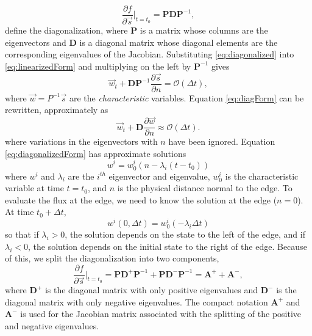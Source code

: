 \documentclass{softwaremanual}
\begin{document}
\begin{equation}
\frac{\partial f}{\partial \vec{s}}|_{t=t_0} = \boldsymbol{P} \boldsymbol{D} \boldsymbol{P}^{-1},\label{eq:diagonalized}
\end{equation} 
define the diagonalization, where $\boldsymbol{P}$ is a matrix whose columns are the eigenvectors and $\boldsymbol{D}$ is a diagonal matrix whose diagonal elements are the corresponding eigenvalues of the Jacobian. Substituting \eqref{eq:diagonalized} into \eqref{eq:linearizedForm} and multiplying on the left by $\boldsymbol{P}^{-1}$ gives
\begin{equation}
\vec{w}_t + \boldsymbol{D} \boldsymbol{P}^{-1}\frac{\partial \vec{s}}{\partial n}  = \mathcal{O}(\Delta t), \label{eq:diagForm}
\end{equation}
where $\vec{w} = P^{-1}\vec{s}$ are the \textit{characteristic} variables. Equation \eqref{eq:diagForm} can be rewritten, approximately as
\begin{equation}
\vec{w}_t + \boldsymbol{D} \frac{\partial \vec{w}}{\partial n}  \approx \mathcal{O}(\Delta t). \label{eq:diagonalizedForm}
\end{equation}
where variations in the eigenvectors with $n$ have been ignored. Equation \eqref{eq:diagonalizedForm} has approximate solutions
\begin{equation}
w^i = w^i_0( n - \lambda_i (t-t_0)) \label{eq:characteristicSolution}
\end{equation}
where $w^i$ and $\lambda_i$ are the $i^{th}$ eigenvector and eigenvalue, $w^i_0$ is the characteristic variable at time $t=t_0$, and $n$ is the physical distance normal to the edge. To evaluate the flux at the edge, we need to know the solution at the edge ($n=0$). At time $t_0 + \Delta t$,
\begin{equation}
w^i(0, \Delta t) = w^i_0(-\lambda_i\Delta t)
\end{equation}  
so that if $\lambda_i > 0$, the solution depends on the state to the left of the edge, and if $\lambda_i < 0$, the solution depends on the initial state to the right of the edge. Because of this, we split the diagonalization into two components,
\begin{equation}
\frac{\partial f}{\partial \vec{s}}|_{t=t_0} = \boldsymbol{P} \boldsymbol{D}^{+} \boldsymbol{P}^{-1} + \boldsymbol{P} \boldsymbol{D}^{-} \boldsymbol{P}^{-1} = \boldsymbol{A}^{+} + \boldsymbol{A}^{-},\label{eq:diagonalized-split}
\end{equation}
where $\boldsymbol{D}^{+}$ is the diagonal matrix with only positive eigenvalues and $\boldsymbol{D}^{-}$ is the diagonal matrix with only negative eigenvalues. The compact notation $\boldsymbol{A}^{+}$ and $\boldsymbol{A}^{-}$ is used for the Jacobian matrix associated with the splitting of the positive and negative eigenvalues. 
\end{document}
